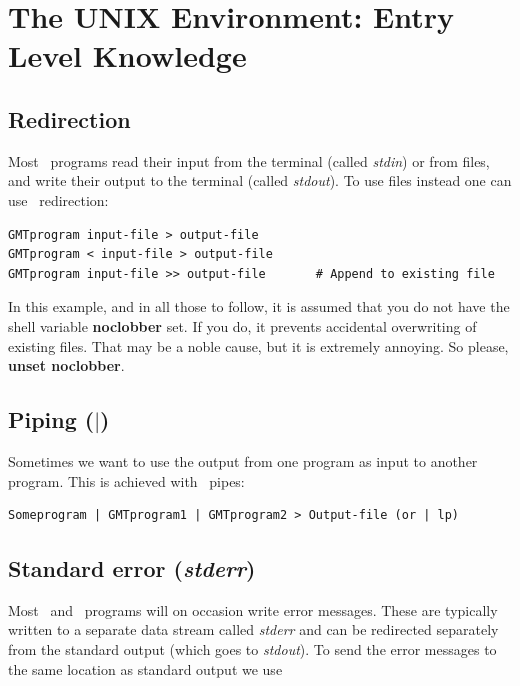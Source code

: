 \documentclass{report}
\begin{document}
\section{The UNIX Environment: Entry Level Knowledge}

\subsection{Redirection}

Most \GMT\ programs read their input from the terminal (called
\emph{stdin}) or from files, and write their output to the
terminal (called \emph{stdout}).  To use files instead one can
use \UNIX\ redirection:

{\small\begin{verbatim}
GMTprogram input-file > output-file
GMTprogram < input-file > output-file
GMTprogram input-file >> output-file       # Append to existing file
\end{verbatim}
}

\noindent
In this example, and in all those to follow, it is assumed that you do not have the shell
variable {\bf noclobber} set. If you do, it prevents accidental overwriting of existing files.
That may be a noble cause, but it is extremely annoying. So please, {\bf unset noclobber}.

\subsection{Piping ($|$)}

Sometimes we want to use the output from one program as input
to another program.  This is achieved with \UNIX\ pipes:

{\small\begin{verbatim}
Someprogram | GMTprogram1 | GMTprogram2 > Output-file (or | lp) 
\end{verbatim}
}

\subsection{Standard error (\emph{stderr})}

Most \UNIX\ and \GMT\ programs will on occasion write error messages.
These are typically written to a separate data stream called
\emph{stderr} and can be redirected separately from the standard
output (which goes to \emph{stdout}).  To send the error messages to the same location
as standard output we use
\end{document}
